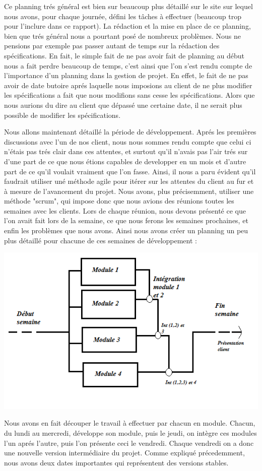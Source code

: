 	Ce planning trés général est bien sur beaucoup plus détaillé sur le site sur lequel nous avons, pour chaque journée, défini les tâches
à effectuer (beaucoup trop pour l'inclure dans ce rapport). La rédaction et la mise en place de ce planning, bien que trés général nous a pourtant posé de nombreux problèmes. Nous 
ne pensions par exemple pas passer autant de temps sur la rédaction des spécifications. En fait, le simple fait de ne pas avoir fait de 
planning au début nous a fait perdre beaucoup de temps, c'est ainsi que l'on s'est rendu compte de l'importance 
d'un planning dans la gestion de projet. En effet, le fait de ne pas avoir de date butoire aprés laquelle nous imposions au client
de ne plus modifier les spécifications a fait que nous modifions sans cesse les spécifications. Alors que nous aurions du dire au client que 
dépassé une certaine date, il ne serait plus possible de modifier les spécifications. 


	Nous allons maintenant détaillé la période de développement. Aprés les premières discussions avec l'un de nos client, nous nous 
sommes rendu compte que celui ci n'étais pas trés clair dans ces attentes, et surtout qu'il n'avais pas l'air trés sur d'une part de 
ce que nous étions capables de developper en un mois et d'autre part de ce qu'il voulait vraiment que l'on fasse. Ainsi, il nous a paru 
évident qu'il faudrait utiliser uné méthode agile pour itérer sur les attentes du client au fur et à mesure de l'avancement
du projet. Nous avons, plus précisemment, utiliser une méthode "scrum", qui impose donc que nous avions des réunions toutes les semaines 
avec les clients. Lors de chaque réunion, nous devons présenté ce que l'on avait fait lors de la semaine, ce que nous ferons les semaines prochaines, 
et enfin les problèmes que nous avons. Ainsi nous avons créer un planning un peu plus détaillé pour chacune de ces semaines de développement :

\includegraphics[scale=1]{planning.png}


Nous avons en fait découper le travail à effectuer par chacun en module. Chacun, du lundi au mercredi, développe son module, puis le jeudi, on intègre
ces modules l'un aprés l'autre, puis l'on présente ceci le vendredi. Chaque vendredi on a donc une nouvelle version intermédiaire du projet. Comme 
expliqué précedemment, nous avons deux dates importantes qui représentent des versions stables.